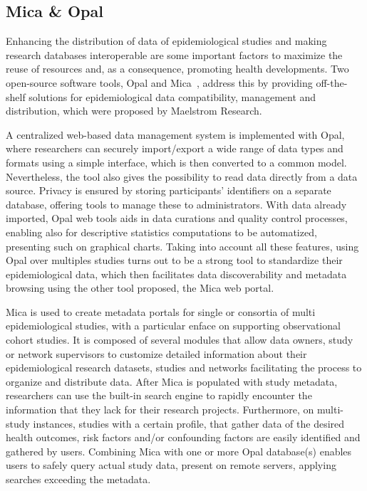 \subsection*{Mica \& Opal}
Enhancing the distribution of data of epidemiological studies and making research databases interoperable are some important factors to maximize the reuse of resources and, as a consequence, promoting health developments.
Two open-source software tools, Opal and Mica~\cite{mica}, address this by providing off-the-shelf solutions for epidemiological data compatibility, management and distribution, which were proposed by Maelstrom Research.

A centralized web-based data management system is implemented with Opal, where researchers can securely import/export a wide range of data types and formats using a simple interface, which is then converted to a common model.
Nevertheless, the tool also gives the possibility to read data directly from a data source.
Privacy is ensured by storing participants' identifiers on a separate database, offering tools to manage these to administrators.
With data already imported, Opal web tools aids in data curations and quality control processes, enabling also for descriptive statistics computations to be automatized, presenting such on graphical charts.
Taking into account all these features, using Opal over multiples studies turns out to be a strong tool to standardize their epidemiological data, which then facilitates data discoverability and metadata browsing using the other tool proposed, the Mica web portal.

Mica is used to create metadata portals for single or consortia of multi epidemiological studies, with a particular enface on supporting observational cohort studies.
It is composed of several modules that allow data owners, study or network supervisors to customize detailed information about their epidemiological research datasets, studies and networks facilitating the process to organize and distribute data.
After Mica is populated with study metadata, researchers can use the built-in search engine to rapidly encounter the information that they lack for their research projects.
Furthermore, on multi-study instances, studies with a certain profile, that gather data of the desired health outcomes, risk factors and/or confounding factors are easily identified and gathered by users.
Combining Mica with one or more Opal database(s) enables users to safely query actual study data, present on remote servers, applying searches exceeding the metadata.

